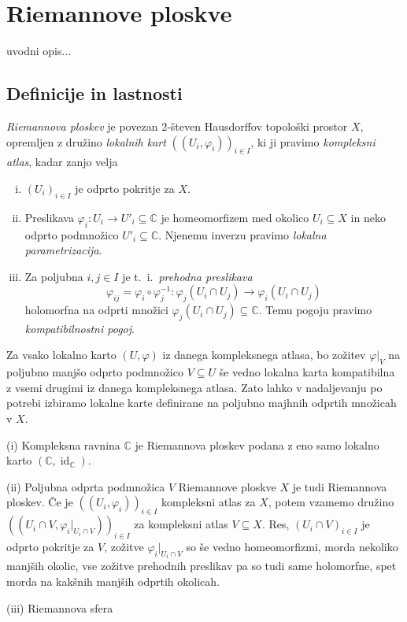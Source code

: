 \documentclass[mat1]{fmfdelo}
\numberwithin{equation}{section}
\newcommand{\C}{\mathbb C}
\newcommand{\inv}{^{-1}}
\newcommand{\ti}{t.~i.\ }
\DeclareMathOperator{\id}{id}
\theoremstyle{definition}
\begin{document}
\section{Riemannove ploskve} \label{riemannove ploskve}
uvodni opis...
\subsection{Definicije in lastnosti}


\begin{definicija}
    \emph{Riemannova ploskev} je povezan $2$-števen Hausdorffov topološki prostor $X$, opremljen z družino \emph{lokalnih kart} $((U_i, \varphi_i))_{i \in I}$, ki ji pravimo \emph{kompleksni atlas}, kadar zanjo velja
    \begin{enumerate}[(i)]
        \item $(U_i)_{i \in I}$ je odprto pokritje za $X$.
        \item Preslikava $\varphi_i : U_i \to U'_i \subseteq \C$ je homeomorfizem med okolico $U_i \subseteq X$ in neko odprto podmnožico $U'_i \subseteq \C$. Njenemu inverzu pravimo \emph{lokalna parametrizacija}.
        \item Za poljubna $i,j \in I$ je \ti \emph{prehodna preslikava}
        \[
            \varphi_{ij} = \varphi_i \circ \varphi_j\inv : \varphi_j(U_i \cap U_j) \longrightarrow  \varphi_i(U_i \cap U_j)   
        \]
        holomorfna na odprti množici $\varphi_j(U_i \cap U_j) \subseteq \C$. Temu pogoju pravimo \emph{kompatibilnostni pogoj}.
    \end{enumerate}
\end{definicija}

\begin{opomba}
    Za vsako lokalno karto $(U, \varphi)$ iz danega kompleksnega atlasa, bo zožitev $\varphi|_V$ na poljubno manjšo odprto podmnožico $V \subseteq U$ še vedno lokalna karta kompatibilna z vsemi drugimi iz danega kompleksnega atlasa. Zato lahko v nadaljevanju po potrebi izbiramo lokalne karte definirane na poljubno majhnih odprtih množicah v $X$. 
\end{opomba}

\begin{zgled*}
    (i) Kompleksna ravnina $\C$ je Riemannova ploskev podana z eno samo lokalno karto $(\C, \id_\C)$. 

    (ii) Poljubna odprta podmnožica $V$ Riemannove ploskve $X$ je tudi Riemannova ploskev. Če je $((U_i, \varphi_i))_{i \in I}$ kompleksni atlas za $X$, potem vzamemo družino $((U_i \cap V, \varphi_i|_{U_i \cap V}))_{i \in I}$ za kompleksni atlas $V\subseteq X$. Res, $(U_i \cap V)_{i \in I}$ je odprto pokritje za $V$, zožitve $\varphi_i|_{U_i \cap V}$ so še vedno homeomorfizmi, morda nekoliko manjših okolic, vse zožitve prehodnih preslikav pa so tudi same holomorfne, spet morda na kakšnih manjših odprtih okolicah. 
    
    (iii) Riemannova sfera
\end{zgled*}
\end{document}

